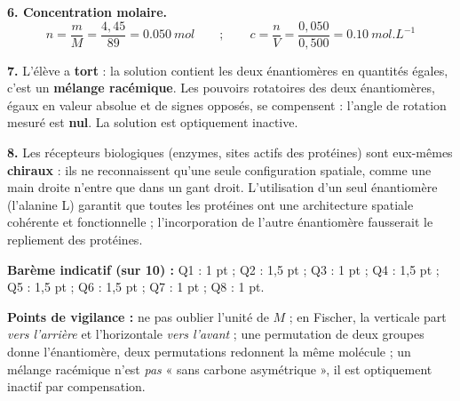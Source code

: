 \documentclass[11pt]{article}
\begin{document}
\begin{corrige}
\textbf{6. Concentration molaire.}
\[ n = \frac{m}{M} = \frac{4,45}{89} = \SI{0,050}{mol} \qquad ; \qquad c = \frac{n}{V} = \frac{0,050}{0,500} = \SI{0,10}{mol.L^{-1}} \]

\textbf{7.} L'élève a \textbf{tort} : la solution contient les deux énantiomères en quantités égales, c'est un \textbf{mélange racémique}. Les pouvoirs rotatoires des deux énantiomères, égaux en valeur absolue et de signes opposés, se compensent : l'angle de rotation mesuré est \textbf{nul}. La solution est optiquement inactive.

\textbf{8.} Les récepteurs biologiques (enzymes, sites actifs des protéines) sont eux-mêmes \textbf{chiraux} : ils ne reconnaissent qu'une seule configuration spatiale, comme une main droite n'entre que dans un gant droit. L'utilisation d'un seul énantiomère (l'alanine L) garantit que toutes les protéines ont une architecture spatiale cohérente et fonctionnelle ; l'incorporation de l'autre énantiomère fausserait le repliement des protéines.

\medskip
\textbf{Barème indicatif (sur 10) :} Q1 : 1 pt ; Q2 : 1,5 pt ; Q3 : 1 pt ; Q4 : 1,5 pt ; Q5 : 1,5 pt ; Q6 : 1,5 pt ; Q7 : 1 pt ; Q8 : 1 pt.

\textbf{Points de vigilance :} ne pas oublier l'unité de $M$ ; en Fischer, la verticale part \emph{vers l'arrière} et l'horizontale \emph{vers l'avant} ; une permutation de deux groupes donne l'énantiomère, deux permutations redonnent la même molécule ; un mélange racémique n'est \emph{pas} « sans carbone asymétrique », il est optiquement inactif par compensation.
\end{corrige}
\end{document}
